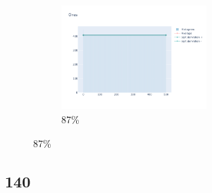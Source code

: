 \documentclass[12pt, fleqn]{report}                             %
\theoremstyle{break}                                            %
\begin{document}
\begin{figure}[ht!]
\begin{subfigure}[b]{0.4\linewidth}
          \includegraphics[width=0.6\textwidth]{Images/138/dia-d.png}
          \caption{87\%}
        \end{subfigure}
      \end{figure}


      \clearpage
      \subsection{140}
\end{document}
